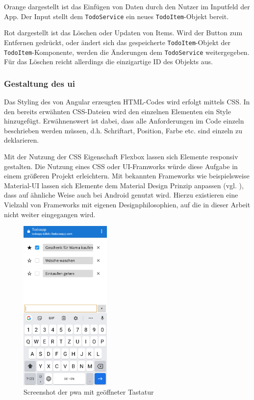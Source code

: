 Orange dargestellt ist das Einfügen von Daten durch den Nutzer im Inputfeld der App. Der Input stellt dem \texttt{TodoService} ein neues \texttt{TodoItem}-Objekt bereit.

Rot dargestellt ist das Löschen oder Updaten von Items. Wird der Button zum Entfernen gedrückt, oder ändert sich das gespeicherte \texttt{TodoItem}-Objekt der \texttt{TodoItem}-Komponente, werden die Änderungen dem \texttt{TodoService} weitergegeben.
Für das Löschen reicht allerdings die einzigartige ID des Objekts aus.

\subsubsection{Gestaltung des \acl{ui}}
Das Styling des von Angular erzeugten HTML-Codes wird erfolgt mittels CSS. In den bereits erwähnten CSS-Dateien wird den einzelnen Elementen ein Style hinzugefügt.
Erwähnenswert ist dabei, dass alle Anforderungen im Code einzeln beschrieben werden müssen, d.h. Schriftart, Position, Farbe etc. sind einzeln zu deklarieren.

Mit der Nutzung der CSS Eigenschaft Flexbox lassen sich Elemente responsiv gestalten. Die Nutzung eines CSS oder UI-Framworks würde diese Aufgabe in einem größeren Projekt erleichtern. Mit bekannten Frameworks wie beispielsweise Material-UI lassen sich Elemente dem Material Design Prinzip anpassen (vgl. \cite{MaterialUI}), dass auf ähnliche Weise auch bei Android genutzt wird. Hierzu existieren eine Vielzahl von Frameworks mit eigenen Designphilosophien, auf die in dieser Arbeit nicht weiter eingegangen wird.

\begin{figure}[h!]
	\centering
	\includegraphics[width=0.4\textwidth]{img/pwa_screenshot_mit_tastatur.png}
	\caption{Screenshot der \ac{pwa} mit geöffneter Tastatur}
	\label{fig:pwa_mit_tastatur}
\end{figure}

